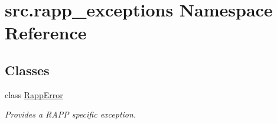 \hypertarget{namespacesrc_1_1rapp__exceptions}{\section{src.\-rapp\-\_\-exceptions Namespace Reference}
\label{namespacesrc_1_1rapp__exceptions}
}
\subsection*{Classes}
\begin{DoxyCompactItemize}
\item 
class \hyperlink{classsrc_1_1rapp__exceptions_1_1RappError}{Rapp\-Error}
\begin{DoxyCompactList}\small\item\em Provides a R\-A\-P\-P specific exception. \end{DoxyCompactList}\end{DoxyCompactItemize}
